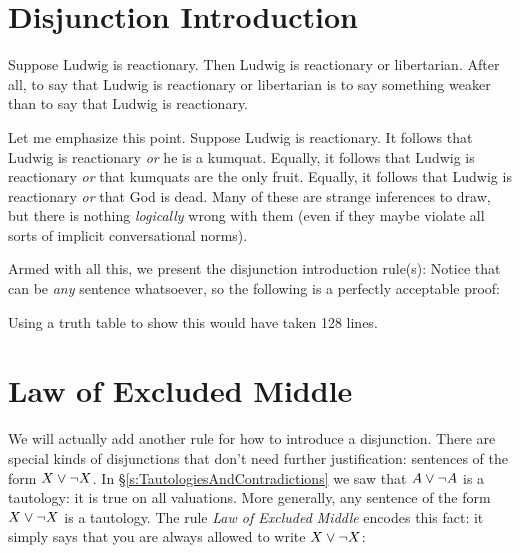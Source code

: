 \section{Disjunction Introduction}
Suppose Ludwig is reactionary. Then Ludwig is reactionary or libertarian. After all, to say that Ludwig is reactionary or libertarian is to say something weaker than to say that Ludwig is reactionary. 

Let me emphasize this point. Suppose Ludwig is reactionary. It follows that Ludwig is reactionary \emph{or} he is a kumquat. Equally, it follows that Ludwig is reactionary \emph{or} that kumquats are the only fruit.  Equally, it follows that Ludwig is reactionary \emph{or} that God is dead. Many of these are strange inferences to draw, but there is nothing \emph{logically} wrong with them (even if they maybe violate all sorts of implicit conversational norms).

Armed with all this, we present the disjunction introduction rule(s):
Notice that \metaY can be \emph{any} sentence whatsoever, so the following is a perfectly acceptable proof:
\begin{pf}
\end{pf}
Using a truth table to show this would have taken 128 lines.


\section{Law of Excluded Middle}\label{sec:LEM}
We will actually add another rule for how to introduce a disjunction. There are special kinds of disjunctions that don't need further justification: sentences of the form $X\vee\neg X$.
In \S\ref{s:TautologiesAndContradictions} we saw that $A\vee\neg A$ is a tautology: it is true on all valuations. More generally, any sentence of the form $X\vee\neg X$ is a tautology.  
The rule \emph{Law of Excluded Middle} encodes this fact: it simply says that you are always allowed to write $X\vee\neg X$:


